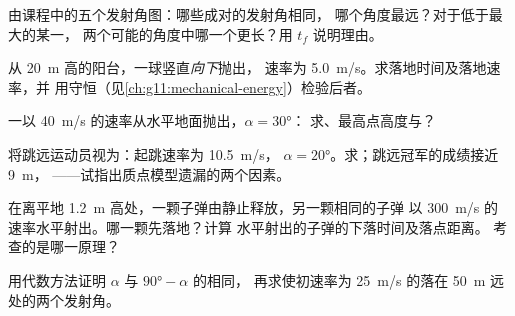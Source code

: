 \begin{exercise}[$\star\star$]\label{exo:g12:projectile-motion:6}
由课程中的五个发射角图：哪些成对的发射角相同，
哪个角度最远？对于低于最大的某一，
两个可能的角度中哪一个更长？用 $t_f$ 说明理由。
\end{exercise}

\begin{exercise}[$\star\star$]\label{exo:g12:projectile-motion:7}
从 \qty{20}{m} 高的阳台，一球竖直\emph{向下}抛出，
速率为 \qty{5.0}{m/s}。求落地时间及落地速率，并
用守恒（见\cref{ch:g11:mechanical-energy}）检验后者。
\end{exercise}

\begin{exercise}[$\star\star$]\label{exo:g12:projectile-motion:8}
一以 \qty{40}{m/s} 的速率从水平地面抛出，$\alpha = \ang{30}$：
求、最高点高度与？
\end{exercise}

\begin{exercise}[$\star\star$]\label{exo:g12:projectile-motion:9}
将跳远运动员视为：起跳速率为 \qty{10.5}{m/s}，
$\alpha = \ang{20}$。求；跳远冠军的成绩接近 \qty{9}{m}，
——试指出质点模型遗漏的两个因素。
\end{exercise}

\begin{exercise}[$\star\star$]\label{exo:g12:projectile-motion:10}
在离平地 \qty{1.2}{m} 高处，一颗子弹由静止释放，另一颗相同的子弹
以 \qty{300}{m/s} 的速率水平射出。哪一颗先落地？计算
水平射出的子弹的下落时间及落点距离。
考查的是哪一原理？
\end{exercise}

\begin{exercise}[$\star\star$]\label{exo:g12:projectile-motion:11}
用代数方法证明 $\alpha$ 与 $\ang{90} - \alpha$ 的相同，
再求使初速率为 \qty{25}{m/s} 的落在 \qty{50}{m}
远处的两个发射角。
\end{exercise}

